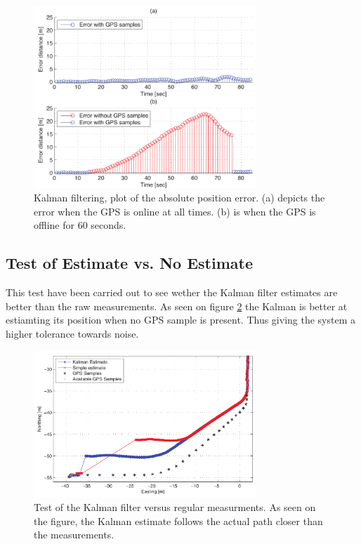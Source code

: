 \documentclass{ifacconf}
\begin{document}
\begin{figure}
	\begin{center}
		\includegraphics[width=8.4cm]{img/error}    %
		\caption{Kalman filtering, plot of the absolute position error. (a) depicts the error when the GPS is online at all times. (b) is when the GPS is offline for 60 seconds.}  %
		\label{fig:error}               
	\end{center}                                 %
\end{figure}

\subsection{Test of Estimate vs. No Estimate}
This test have been carried out to see wether the Kalman filter estimates are better than the raw measurements. As seen on figure \ref{fig:kalaman} the Kalman is better at estiamting its position when no GPS sample is present. Thus giving the system a higher tolerance towards noise. 
\begin{figure}
	\begin{center}
		\includegraphics[width=8.4cm]{img/kalmanestimate}    %
		\caption{Test of the Kalman filter versus regular measurments. As seen on the figure, the Kalman estimate follows the actual path closer than the measurements.}  %
		\label{fig:kalaman}               
	\end{center}                                 %
\end{figure}
\end{document}
